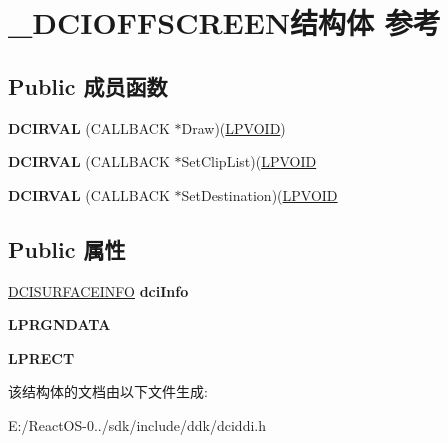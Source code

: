 \hypertarget{struct___d_c_i_o_f_f_s_c_r_e_e_n}{}\section{\+\_\+\+D\+C\+I\+O\+F\+F\+S\+C\+R\+E\+E\+N结构体 参考}
\label{struct___d_c_i_o_f_f_s_c_r_e_e_n}
\subsection*{Public 成员函数}
\begin{DoxyCompactItemize}
\item 
\mbox{\label{struct___d_c_i_o_f_f_s_c_r_e_e_n_a6dc0b9880d729c6782901b2792d37561}} 
{\bfseries D\+C\+I\+R\+V\+AL} (C\+A\+L\+L\+B\+A\+CK $\ast$Draw)(\hyperlink{interfacevoid}{L\+P\+V\+O\+ID})
\item 
\mbox{\label{struct___d_c_i_o_f_f_s_c_r_e_e_n_ad238f902f461d9ed755f86b40ab6d744}} 
{\bfseries D\+C\+I\+R\+V\+AL} (C\+A\+L\+L\+B\+A\+CK $\ast$Set\+Clip\+List)(\hyperlink{interfacevoid}{L\+P\+V\+O\+ID}
\item 
\mbox{\label{struct___d_c_i_o_f_f_s_c_r_e_e_n_a6ef032854ab9e64247dd2722a6481827}} 
{\bfseries D\+C\+I\+R\+V\+AL} (C\+A\+L\+L\+B\+A\+CK $\ast$Set\+Destination)(\hyperlink{interfacevoid}{L\+P\+V\+O\+ID}
\end{DoxyCompactItemize}
\subsection*{Public 属性}
\begin{DoxyCompactItemize}
\item 
\mbox{\label{struct___d_c_i_o_f_f_s_c_r_e_e_n_a21e04df30db716680abc0b023b4d52ca}} 
\hyperlink{struct___d_c_i_s_u_r_f_a_c_e_i_n_f_o}{D\+C\+I\+S\+U\+R\+F\+A\+C\+E\+I\+N\+FO} {\bfseries dci\+Info}
\item 
\mbox{\label{struct___d_c_i_o_f_f_s_c_r_e_e_n_af0bb8bb2080bbbc64d5c3d07c18a713e}} 
{\bfseries L\+P\+R\+G\+N\+D\+A\+TA}
\item 
\mbox{\label{struct___d_c_i_o_f_f_s_c_r_e_e_n_a6fd9106bea5071460c68554728887fd8}} 
{\bfseries L\+P\+R\+E\+CT}
\end{DoxyCompactItemize}


该结构体的文档由以下文件生成\+:\begin{DoxyCompactItemize}
\item 
E\+:/\+React\+O\+S-\/0../sdk/include/ddk/dciddi.\+h\end{DoxyCompactItemize}

